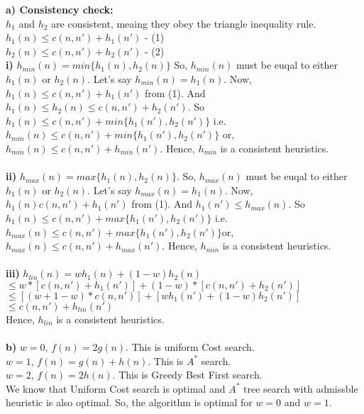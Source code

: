 {\bf a) Consistency check:}\\
$h_1$ and $h_2$ are consistent, meaing they obey the triangle inequality rule.\\ 
${h_1}(n) \leq c(n, n') + {h_1}(n')$  - (1)\\
${h_2}(n) \leq c(n, n') + {h_2}(n')$  - (2)\\

{\bf i)} $h_{min}(n) = min\{{h_1}(n), {h_2}(n)\}$ So, $h_{min}(n)$ must be euqal to either ${h_1}(n)$ or ${h_2}(n)$. Let's say $h_{min}(n) = {h_1}(n)$. Now, ${h_1}(n) \leq c(n, n') + {h_1}(n')$ from (1). And ${h_1}(n) \leq {h_2}(n) \leq c(n, n') + {h_2}(n')$. So  ${h_1}(n)  \leq c(n, n') + min\{{h_1}(n'), {h_2}(n')\}$ i.e. $h_{min}(n) \leq c(n, n') + min\{{h_1}(n'), {h_2}(n')\}$ or, $h_{min}(n) \leq c(n, n') + h_{min}(n')$. Hence, $h_{min}$ is a consistent heuristics.
\\ \\

{\bf ii)} $h_{max}(n) = max\{{h_1}(n), {h_2}(n)\}$. So, $h_{max}(n)$ must be euqal to either ${h_1}(n)$ or ${h_2}(n)$.
Let's say $h_{max}(n) = {h_1}(n)$. Now, ${h_1}(n)  c(n, n') + {h_1}(n')$ from (1). And ${h_1}(n') \leq h_{max}(n)$. So  ${h_1}(n)  \leq c(n, n') + max\{{h_1}(n'), {h_2}(n')\}$ i.e. $h_{max}(n) \leq c(n, n') + max\{{h_1}(n'), {h_2}(n')\}$or, $h_{max}(n) \leq c(n, n') + h_{max}(n')$. Hence, $h_{min}$ is a consistent heuristics.\\ \\

{\bf iii)} $h_{lin}(n) = w{h_1}(n)+ (1 -w){h_2}(n)$ \\ $\leq w* [c(n, n') + {h_1}(n')] + (1 - w)*[c(n, n') + {h_2}(n')]$ \\
$\leq [(w + 1- w) * c(n, n')] + [w{h_1}(n') + (1 - w){h_2}(n')]$\\
$\leq c(n, n') + h_{lin}(n')$\\
Hence, $h_{lin}$ is a consistent heuristics.\\ \\

{\bf b)}
$w = 0$, $f(n) = 2g(n)$. This is uniform Cost search.\\
$w = 1$, $f(n) = g(n) + h(n)$. This is $A^*$ search.\\
$w = 2$, $f(n) = 2h(n)$. This is Greedy Best First search.\\
We know that Uniform Cost search is optimal and $A^*$ tree search with admissble heuristic is also optimal. So, the algorithm is optimal for  $w = 0$ and $w = 1$.\\ \\

